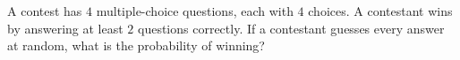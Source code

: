 A contest has $4$ multiple-choice questions, each with $4$ choices. A contestant wins by answering at least $2$ questions correctly. If a contestant guesses every answer at random, what is the probability of winning?
